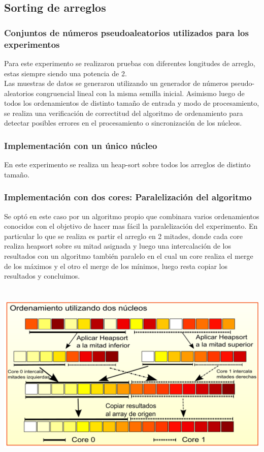 \subsection{Sorting de arreglos}	
    \subsubsection{Conjuntos de números pseudoaleatorios utilizados para los experimentos}
    	Para este experimento se realizaron pruebas con diferentes longitudes de arreglo, estas siempre
    	siendo una potencia de 2.\\
    	Las muestras de datos se generaron utilizando un generador de números pseudo-aleatorios
    	congruencial lineal con la misma semilla inicial.
        Asimismo luego de todos los ordenamientos de distinto tamaño de entrada y modo de procesamiento, se realiza una verificación de correctitud del algoritmo de ordenamiento para detectar posibles errores en el procesamiento o sincronización de los núcleos.
    \subsubsection{Implementación con un único núcleo}
    	En este experimento se realiza un heap-sort sobre todos los arreglos de distinto tamaño.
    \subsubsection{Implementación con dos cores: Paralelización del algoritmo}
    	Se optó en este caso por un algoritmo propio que combinara varios ordenamientos conocidos con el objetivo de hacer mas fácil la paralelización del experimento. En particular lo que se realiza es partir el arreglo en 2 mitades, donde cada core realiza heapsort sobre su mitad asignada y luego una intercalación de los resultados con un algoritmo también paralelo en el cual un core realiza el merge de los máximos y el otro el merge de los mínimos, luego resta copiar los resultados y concluimos.

   	\begin{center}
        \includegraphics[height=9cm]{images/dualcore-sorting.pdf}
    \end{center}
    	

